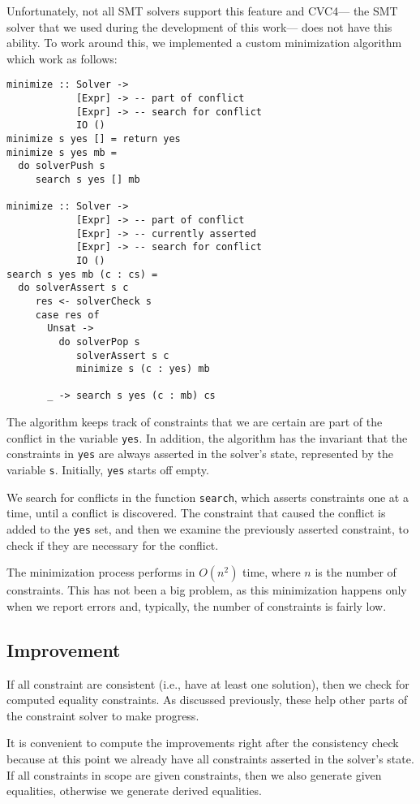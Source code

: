 \documentclass{sigplanconf}
\begin{document}
Unfortunately, not all SMT solvers support this feature and CVC4---%
the SMT solver that we used during the development of this work---%
does not have this ability.  To work around this, we implemented
a custom minimization algorithm which work as follows:
\begin{Verbatim}
minimize :: Solver ->
            [Expr] -> -- part of conflict
            [Expr] -> -- search for conflict
            IO ()
minimize s yes [] = return yes
minimize s yes mb =
  do solverPush s
     search s yes [] mb

minimize :: Solver ->
            [Expr] -> -- part of conflict
            [Expr] -> -- currently asserted
            [Expr] -> -- search for conflict
            IO ()
search s yes mb (c : cs) =
  do solverAssert s c
     res <- solverCheck s
     case res of
       Unsat ->
         do solverPop s
            solverAssert s c
            minimize s (c : yes) mb

       _ -> search s yes (c : mb) cs
\end{Verbatim}
The algorithm keeps track of constraints that we are certain are part
of the conflict in the variable \Verb"yes".  In addition, the algorithm
has the invariant that the constraints in \Verb"yes" are always asserted
in the solver's state, represented by the variable \Verb"s".
Initially, \Verb"yes" starts off empty.

We search for conflicts in the function \Verb"search", which asserts
constraints one at a time, until a conflict is discovered.  The constraint
that caused the conflict is added to the \Verb"yes" set, and then we
examine the previously asserted constraint, to check if they are necessary
for the conflict.

The minimization process performs in $O(n^2)$ time, where $n$ is the
number of constraints.  This has not been a big problem,
as this minimization happens only when we report errors and, typically,
the number of constraints is fairly low.


\subsection{Improvement}

If all constraint are consistent (i.e., have at least one solution),
then we check for computed equality constraints.  As discussed previously,
these help other parts of the constraint solver to make progress.

It is convenient to compute the improvements right after the consistency
check because at this point we already have all constraints asserted
in the solver's state.  If all constraints in scope are given constraints,
then we also generate given equalities, otherwise we generate derived
equalities.
\end{document}
